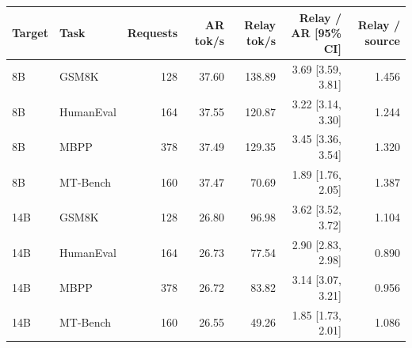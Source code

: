 \begin{tabular}{llrrrrr}
\toprule
Target & Task & Requests & AR tok/s & Relay tok/s & Relay / AR [95\% CI] & Relay / source \\
\midrule
8B & GSM8K & 128 & 37.60 & 138.89 & 3.69 [3.59, 3.81] & 1.456 \\
8B & HumanEval & 164 & 37.55 & 120.87 & 3.22 [3.14, 3.30] & 1.244 \\
8B & MBPP & 378 & 37.49 & 129.35 & 3.45 [3.36, 3.54] & 1.320 \\
8B & MT-Bench & 160 & 37.47 & 70.69 & 1.89 [1.76, 2.05] & 1.387 \\
14B & GSM8K & 128 & 26.80 & 96.98 & 3.62 [3.52, 3.72] & 1.104 \\
14B & HumanEval & 164 & 26.73 & 77.54 & 2.90 [2.83, 2.98] & 0.890 \\
14B & MBPP & 378 & 26.72 & 83.82 & 3.14 [3.07, 3.21] & 0.956 \\
14B & MT-Bench & 160 & 26.55 & 49.26 & 1.85 [1.73, 2.01] & 1.086 \\
\bottomrule
\end{tabular}
